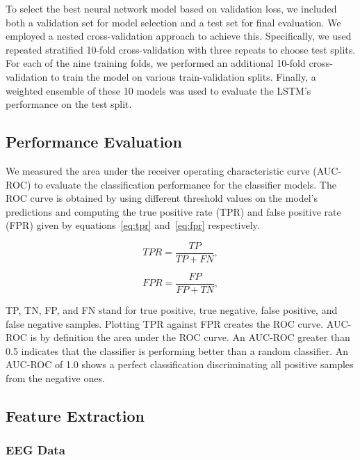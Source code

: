 To select the best neural network model based on validation loss, we included both a validation set for model selection and a test set for final evaluation. We employed a nested cross-validation approach to achieve this. Specifically, we used repeated stratified 10-fold cross-validation with three repeats to choose test splits. For each of the nine training folds, we performed an additional 10-fold cross-validation to train the model on various train-validation splits. Finally, a weighted ensemble of these 10 models was used to evaluate the LSTM's performance on the test split.

\subsection*{Performance Evaluation}

We measured the area under the receiver operating characteristic curve (AUC-ROC) to evaluate the classification performance for the classifier models. The ROC curve is obtained by using different threshold values on the model's predictions and computing the true positive rate (TPR) and false positive rate (FPR) given by equations~\ref{eq:tpr} and~\ref{eq:fpr} respectively. 

\begin{equation}
    \label{eq:tpr}
    TPR = \frac{TP}{TP + FN} ,
\end{equation}

\begin{equation}
    \label{eq:fpr}
    FPR = \frac{FP}{FP + TN} ,
\end{equation}

TP, TN, FP, and FN stand for true positive, true negative, false positive, and false negative samples. Plotting TPR against FPR creates the ROC curve. AUC-ROC is by definition the area under the ROC curve. An AUC-ROC greater than 0.5 indicates that the classifier is performing better than a random classifier. An AUC-ROC of 1.0 shows a perfect classification discriminating all positive samples from the negative ones. 

\subsection*{Feature Extraction}

\subsubsection*{EEG Data}

